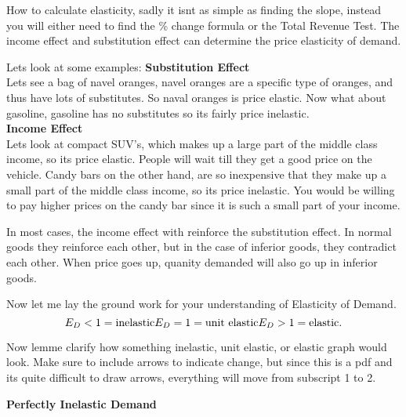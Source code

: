 How to calculate elasticity, sadly it isnt as simple as finding the slope, instead you will either need to find the \% change formula or the Total Revenue Test. The income effect and substitution effect can determine the price elasticity of demand.
\begin{example}
    Lets look at some examples:
    \textbf{Substitution Effect}\\
    Lets see a bag of navel oranges, navel oranges are a specific type of oranges, and thus have lots of substitutes. So naval oranges is price elastic. Now what about gasoline, gasoline has no substitutes so its fairly price inelastic. \\
    \textbf{Income Effect}\\
    Lets look at compact SUV's, which makes up a large part of the middle class income, so its price elastic. People will wait till they get a good price on the vehicle. Candy bars on the other hand, are so inexpensive that they make up a small part of the middle class income, so its price inelastic. You would be willing to pay higher prices on the candy bar since it is such a small part of your income. 
\end{example}

In most cases, the income effect with reinforce the substitution effect. In normal goods they reinforce each other, but in the case of inferior goods, they contradict each other. When price goes up, quanity demanded will also go up in inferior goods. 

Now let me lay the ground work for your understanding of Elasticity of Demand.
\[
    E_D < 1 = \text{inelastic}\\
    E_D = 1 = \text{unit elastic}\\
    E_D > 1 = \text{elastic}
.\] 

Now lemme clarify how something inelastic, unit elastic, or elastic graph would look. Make sure to include arrows to indicate change, but since this is a pdf and its quite difficult to draw arrows, everything will move from subscript 1 to 2.

\textbf{Perfectly Inelastic Demand}\\

